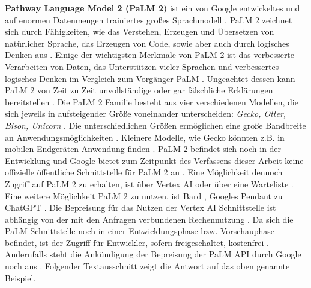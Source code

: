 \textbf{Pathway Language Model 2 (PaLM 2)} \cite{google-blog-io-23} ist ein von Google entwickeltes und auf enormen Datenmengen trainiertes großes Sprachmodell \cite{google-palm2-techreport}.
PaLM 2 zeichnet sich durch Fähigkeiten, wie das Verstehen, Erzeugen und Übersetzen von natürlicher Sprache, das Erzeugen von Code, sowie aber auch durch logisches Denken aus \cite{google-blog-io-23,google-palm2-techreport}.
Einige der wichtigsten Merkmale von PaLM 2 ist das verbesserte Verarbeiten von Daten, das Unterstützen vieler Sprachen und verbessertes logisches Denken im Vergleich zum Vorgänger PaLM \cite{google-palm2-techreport}.
Ungeachtet dessen kann PaLM 2 von Zeit zu Zeit unvollständige oder gar fälschliche Erklärungen bereitstellen \cite{google-bard-faq}.
Die PaLM 2 Familie besteht aus vier verschiedenen Modellen, die sich jeweils in aufsteigender Größe voneinander unterscheiden: \textit{Gecko, Otter, Bison, Unicorn} \cite{google-blog-io-23}.
Die unterschiedlichen Größen ermöglichen eine große Bandbreite an Anwendungsmöglichkeiten \cite{google-blog-io-23}.
Kleinere Modelle, wie Gecko könnten z.B. in mobilen Endgeräten Anwendung finden \cite{google-blog-io-23}.
PaLM 2 befindet sich noch in der Entwicklung und Google bietet zum Zeitpunkt des Verfassens dieser Arbeit keine offizielle öffentliche Schnittstelle für PaLM 2 an \cite{google-palm-api-announcement}.
Eine Möglichkeit dennoch Zugriff auf PaLM 2 zu erhalten, ist über Vertex AI oder über eine Warteliste \cite{google-palm-api-vertex-ai-waitlist}.
Eine weitere Möglichkeit PaLM 2 zu nutzen, ist Bard \cite{google-bard}, Googles Pendant zu ChatGPT \cite{openai-chatgpt}.
Die Bepreisung für das Nutzen der Vertex AI Schnittstelle ist abhängig von der mit den Anfragen verbundenen Rechennutzung \cite{google-vertex-ai-pricing}.
Da sich die PaLM Schnittstelle noch in einer Entwicklungsphase bzw. Vorschauphase befindet, ist der Zugriff für Entwickler, sofern freigeschaltet, kostenfrei \cite{google-palm-api-faq}.
Andernfalls steht die Ankündigung der Bepreisung der PaLM API durch Google noch aus \cite{google-palm-api-faq}.
Folgender Textausschnitt zeigt die Antwort auf das oben genannte Beispiel.
